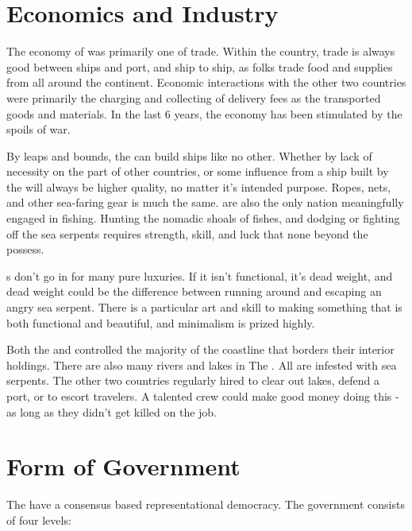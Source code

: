 \documentclass[blue]{GL2020}
\begin{document}
\section*{Economics and Industry}
The economy of \pShip{} was primarily one of trade. Within the country, trade is always good between ships and port, and ship to ship, as folks trade food and supplies from all around the continent. Economic interactions with the other two countries were primarily the charging and collecting of delivery fees as the \pShippies{} transported goods and materials. In the last 6 years, the economy has been stimulated by the spoils of war.

By leaps and bounds, the \pShippies{} can build ships like no other. Whether by lack of necessity on the part of other countries, or some influence from \cEbbFull{} a ship built by the \pShippies{} will always be higher quality, no matter it's intended purpose. Ropes, nets, and other sea-faring gear is much the same. \pShippies{} are also the only nation meaningfully engaged in fishing. Hunting the nomadic shoals of fishes, and dodging or fighting off the sea serpents requires strength, skill, and luck that none beyond the \pShippies{} possess.

\pShippies{}s don't go in for many pure luxuries. If it isn't functional, it's dead weight, and dead weight could be the difference between running around and escaping an angry sea serpent. There is a particular art and skill to making something that is both functional and beautiful, and minimalism is prized highly.

Both the \pFarm{} and \pTech{} controlled the majority of the coastline that borders their interior holdings. There are also many rivers and lakes in The \pFarm{}. All are infested with sea serpents. The other two countries regularly hired \pShippies{} to clear out lakes, defend a port, or to escort travelers. A talented crew could make good money doing this - as long as they didn't get killed on the job.

\section*{Form of Government} The \pShippies{} have a consensus based representational democracy. The government consists of four levels:
\end{document}
